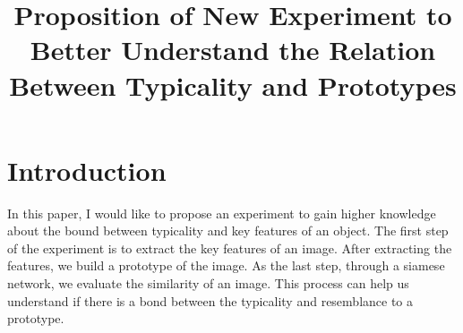\documentclass[conference]{IEEEtran}
\begin{document}
\title{Proposition of New Experiment to Better Understand the Relation Between Typicality and Prototypes%
}

\author{
}

\maketitle

\section{Introduction}
In this paper, I would like to propose an experiment to gain higher knowledge about the bound between typicality and key features of an object. 
The first step of the experiment is to extract the key features of an image. 
After extracting the features, we build a prototype of the image. 
As the last step, through a siamese network, we evaluate the similarity of an image. 
This process can help us understand if there is a bond between the typicality and resemblance to a prototype.
\end{document}
